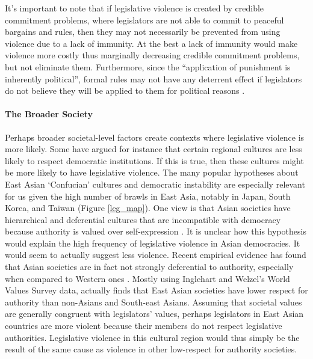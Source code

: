 \documentclass[a4paper]{article}\usepackage[]{graphicx}\usepackage[]{color}
\begin{document}
It's important to note that if legislative violence is created by credible commitment problems, where legislators are not able to commit to peaceful bargains and rules, then they may not necessarily be prevented from using violence due to a lack of immunity. At the best a lack of immunity would make violence more costly thus marginally decreasing credible commitment problems, but not eliminate them. Furthermore, since the ``application of punishment is inherently political'', formal rules may not have any deterrent effect if legislators do not believe they will be applied to them for political reasons \cite[58]{Wolfe2004}.

\paragraph{The Broader Society}

Perhaps broader societal-level factors create contexts where legislative violence is more likely. Some have argued for instance that certain regional cultures are less likely to respect democratic institutions. If this is true, then these cultures might be more likely to have legislative violence. The many popular hypotheses about East Asian `Confucian' cultures \citep[]{Inglehart2005, Inglehart2010} and democratic instability are especially relevant for us given the high number of brawls in East Asia, notably in Japan, South Korea, and Taiwan (Figure \ref{leg_map}). One view is that Asian societies have hierarchical and deferential cultures that are incompatible with democracy because authority is valued over self-expression \citep[212-213]{Dalton2005}. It is unclear how this hypothesis would explain the high frequency of legislative violence in Asian democracies. It would seem to actually suggest less violence. Recent empirical evidence has found that Asian societies are in fact not strongly deferential to authority, especially when compared to Western ones \citep{Dalton2005, KimAsianValues2010}. Mostly using Inglehart and Welzel's World Values Survey data, \cite{KimAsianValues2010} actually finds that East Asian societies have lower respect for authority than non-Asians and South-east Asians. Assuming that societal values are generally congruent with legislators' values, perhaps legislators in East Asian countries are more violent because their members do not respect legislative authorities. Legislative violence in this cultural region would thus simply be the result of the same cause as violence in other low-respect for authority societies.
\end{document}
